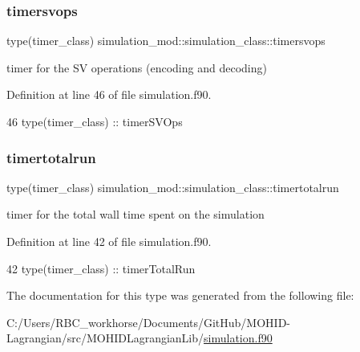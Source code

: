 \subsubsection{\texorpdfstring{timersvops}{timersvops}}
{\footnotesize\ttfamily type(timer\+\_\+class) simulation\+\_\+mod\+::simulation\+\_\+class\+::timersvops\hspace{0.3cm}{\ttfamily [private]}}



timer for the SV operations (encoding and decoding) 



Definition at line 46 of file simulation.\+f90.


\begin{DoxyCode}
46         \textcolor{keywordtype}{type}(timer\_class) :: timerSVOps
\end{DoxyCode}
\mbox{\label{structsimulation__mod_1_1simulation__class_aff028c1a3b421c73038e43b860f45de1}} 
\subsubsection{\texorpdfstring{timertotalrun}{timertotalrun}}
{\footnotesize\ttfamily type(timer\+\_\+class) simulation\+\_\+mod\+::simulation\+\_\+class\+::timertotalrun\hspace{0.3cm}{\ttfamily [private]}}



timer for the total wall time spent on the simulation 



Definition at line 42 of file simulation.\+f90.


\begin{DoxyCode}
42         \textcolor{keywordtype}{type}(timer\_class) :: timerTotalRun
\end{DoxyCode}


The documentation for this type was generated from the following file\+:\begin{DoxyCompactItemize}
\item 
C\+:/\+Users/\+R\+B\+C\+\_\+workhorse/\+Documents/\+Git\+Hub/\+M\+O\+H\+I\+D-\/\+Lagrangian/src/\+M\+O\+H\+I\+D\+Lagrangian\+Lib/\mbox{\hyperlink{simulation_8f90}{simulation.\+f90}}\end{DoxyCompactItemize}
